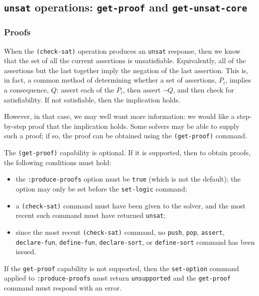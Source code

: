 \documentclass[12pt,oneside]{report}
\newcommand{\nospace}{\setlength{\itemsep}{0in}\setlength{\parsep}{0in}\setlength{\parskip}{0in}\setlength{\topsep}{0in}}
\begin{document}
\subsection{{\tt unsat} operations: {\tt get-proof} and {\tt get-unsat-core}}
\label{unsat-commands}

\subsubsection{Proofs}

When the {\tt (check-sat)} operation produces an {\tt unsat} response,
then we know that the set of all the current assertions is unsatisfiable.
Equivalently, all of the assertions but the last together imply the negation of the
last assertion.  This is, in fact, a common method of determining whether
a set of assertions, $P_i$, implies a consequence, $Q$: assert each of the $P_i$, 
then assert $\lnot Q$, and then check for satisfiability.  If not satisfiable,
then the implication holds.

However, in that case, we may well want more information: we would like a step-by-step
proof that the implication holds.  Some solvers may be able to supply such a 
proof; if so, the proof can be obtained using the {\tt (get-proof)} command.

The {\tt (get-proof)} capability is optional.  If it is supported, then
to obtain proofs, the following conditions must hold:
\begin{itemize} \nospace
\item the {\tt :produce-proofs} option must be {\tt true} (which is not the default); the option may only be set before the
{\tt set-logic} command;
\item a {\tt (check-sat)} command must have been given to the solver, and the most
recent such command must have returned {\tt unsat};
\item since the most recent {\tt (check-sat)} command, no {\tt push}, {\tt pop},
{\tt assert}, {\tt declare-fun}, {\tt define-fun}, {\tt declare-sort}, or {\tt define-sort}
command has been issued.
\end{itemize}

If the {\tt get-proof} capability is not supported, then the {\tt set-option} command applied to
{\tt :produce-proofs} must return {\tt unsupported} and the {\tt get-proof} command must
respond with an error.
\end{document}
